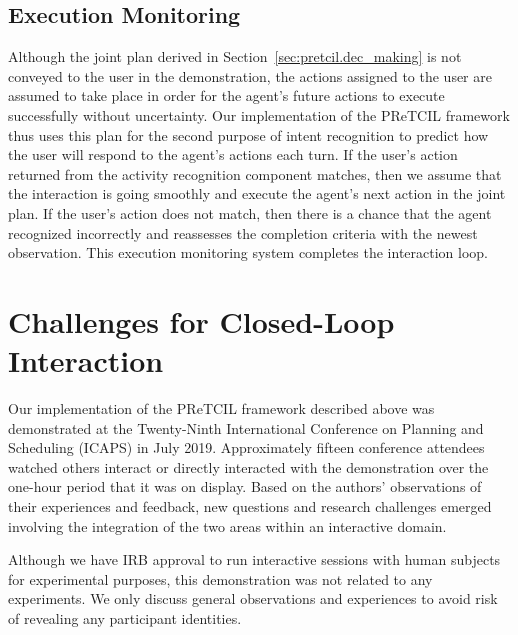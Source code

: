 \documentclass[letterpaper]{article} %
\begin{document}
\subsection{Execution Monitoring\label{sec:pretcil.exec_monitor}}
Although the joint plan derived in Section~\ref{sec:pretcil.dec_making} is not conveyed to the user in the demonstration, the actions assigned to the user are assumed to take place in order for the agent's future actions to execute successfully without uncertainty.  Our implementation of the {\sc PReTCIL} framework thus uses this plan for the second purpose of intent recognition to predict how the user will respond to the agent's actions each turn.  If the user's action returned from the activity recognition component matches, then we assume that the interaction is going smoothly and execute the agent's next action in the joint plan.  If the user's action does not match, then there is a chance that the agent recognized incorrectly and reassesses the %
 completion criteria with the newest observation.  This execution monitoring system completes the interaction loop.%

\section{Challenges for Closed-Loop Interaction \label{sec:challenges}}
Our implementation of the {\sc PReTCIL} framework described above was demonstrated at the Twenty-Ninth International Conference on Planning and Scheduling (ICAPS) in July 2019.  Approximately fifteen conference attendees watched others interact or directly interacted with the demonstration over the one-hour period that it was on display.  Based on the authors' observations of their experiences and feedback, new questions and research challenges emerged involving the integration of the two areas within an interactive domain.

Although we have IRB approval to run interactive sessions with human subjects for experimental purposes, this demonstration was not related to any experiments. %
 We %
 only discuss general observations and experiences to avoid risk of revealing any participant identities.
\end{document}
